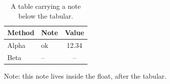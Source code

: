 \begin{table}[htbp]
  \centering
  \caption{A table carrying a note below the tabular.}
  \begin{tabular}{l l S[table-format=2.2]}
    \toprule
    Method & Note & {Value} \\
    \midrule
    Alpha & ok & 12.34 \\
    Beta  & -- & {--} \\
    \bottomrule
  \end{tabular}
  \par\smallskip
  {\footnotesize Note: this note lives inside the float, after the tabular.}
\end{table}
